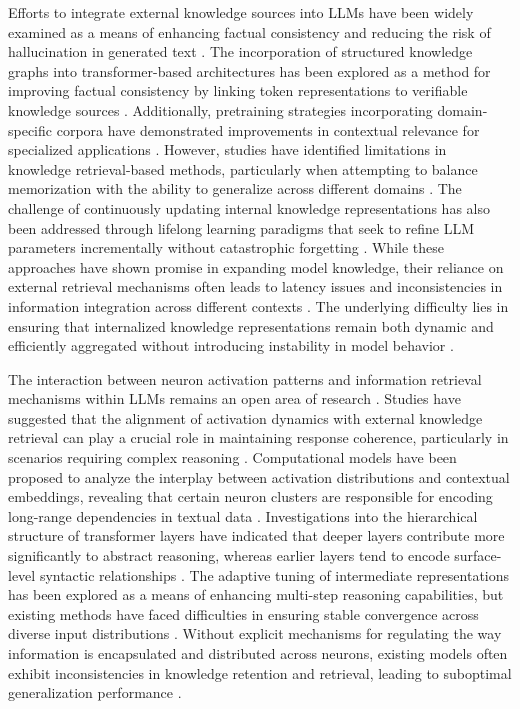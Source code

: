 Efforts to integrate external knowledge sources into LLMs have been widely examined as a means of enhancing factual consistency and reducing the risk of hallucination in generated text \cite{aguiluz2024dynamic}. The incorporation of structured knowledge graphs into transformer-based architectures has been explored as a method for improving factual consistency by linking token representations to verifiable knowledge sources \cite{fa2024modality}. Additionally, pretraining strategies incorporating domain-specific corpora have demonstrated improvements in contextual relevance for specialized applications \cite{lu2024large}. However, studies have identified limitations in knowledge retrieval-based methods, particularly when attempting to balance memorization with the ability to generalize across different domains \cite{mcintosh2024game}. The challenge of continuously updating internal knowledge representations has also been addressed through lifelong learning paradigms that seek to refine LLM parameters incrementally without catastrophic forgetting \cite{tarel2024transformative}. While these approaches have shown promise in expanding model knowledge, their reliance on external retrieval mechanisms often leads to latency issues and inconsistencies in information integration across different contexts \cite{atox2024evaluating}. The underlying difficulty lies in ensuring that internalized knowledge representations remain both dynamic and efficiently aggregated without introducing instability in model behavior \cite{foster2024token}. 

The interaction between neuron activation patterns and information retrieval mechanisms within LLMs remains an open area of research \cite{chard2024auditing}. Studies have suggested that the alignment of activation dynamics with external knowledge retrieval can play a crucial role in maintaining response coherence, particularly in scenarios requiring complex reasoning \cite{hisaharo2024optimizing}. Computational models have been proposed to analyze the interplay between activation distributions and contextual embeddings, revealing that certain neuron clusters are responsible for encoding long-range dependencies in textual data \cite{eamen2024neural}. Investigations into the hierarchical structure of transformer layers have indicated that deeper layers contribute more significantly to abstract reasoning, whereas earlier layers tend to encode surface-level syntactic relationships \cite{ vitiello2024context}. The adaptive tuning of intermediate representations has been explored as a means of enhancing multi-step reasoning capabilities, but existing methods have faced difficulties in ensuring stable convergence across diverse input distributions \cite{kanax2024contextualized, navjord2023beyond}. Without explicit mechanisms for regulating the way information is encapsulated and distributed across neurons, existing models often exhibit inconsistencies in knowledge retention and retrieval, leading to suboptimal generalization performance \cite{wench2024factored}. 

